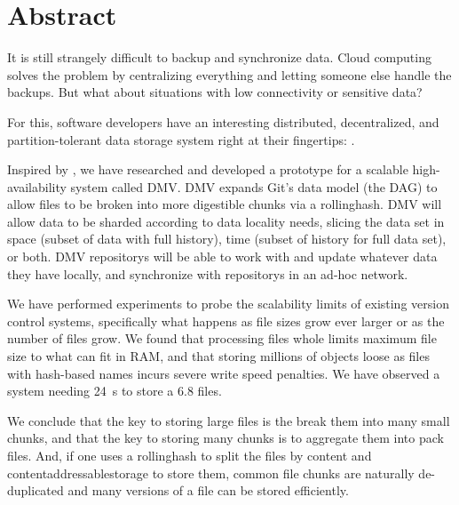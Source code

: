 \chapter{Abstract}

\glsunsetall
{}


It is still strangely difficult to backup and synchronize data. Cloud computing
solves the problem by centralizing everything and letting someone else handle
the backups. But what about situations with low connectivity or sensitive data?


For this, software developers have an interesting distributed, decentralized,
and partition-tolerant data storage system right at their fingertips:
.


Inspired by , we have researched and
developed a prototype for a scalable high-availability system called \gls{DMV}.
\gls{DMV} expands Git's data model (the \acrshort{DAG}) to allow files to be
broken into more digestible chunks via a \gls{rollinghash}. \gls{DMV} will allow
data to be sharded according to data locality needs, slicing the data set in
space (subset of data with full history), time (subset of history for full data
set), or both. \gls{DMV} \glspl{repository} will be able to work with and update
whatever data they have locally, and synchronize with \glspl{repository} in an
ad-hoc network.


We have performed experiments to probe the scalability limits of existing
version control systems, specifically what happens as file sizes grow ever
larger or as the number of files grow. We found that processing files whole
limits maximum file size to what can fit in RAM, and that storing millions of
objects loose as files with hash-based names incurs severe write speed
penalties. We have observed a system needing \SI{24}{\second} to store a
\SI{6.8}{\kib} files.





We conclude that the key to storing large files is the break them into many
small chunks, and that the key to storing many chunks is to aggregate them into
pack files. And, if one uses a \gls{rollinghash} to split the files by content
and \gls{contentaddressablestorage} to store them, common file chunks are
naturally de-duplicated and many versions of a file can be stored efficiently.

%


\glsresetall
